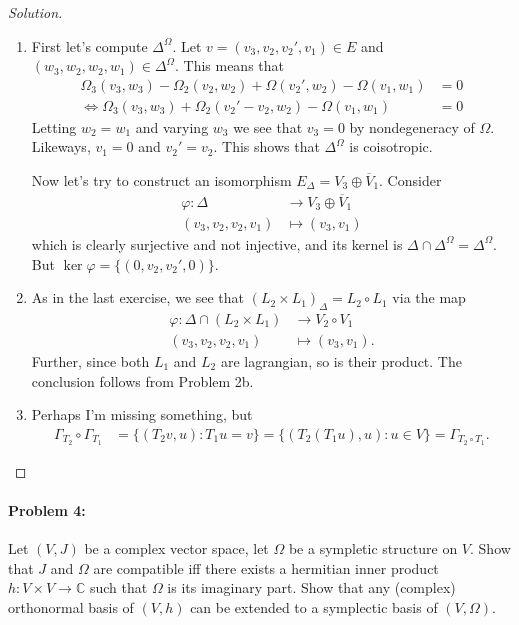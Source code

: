 \begin{proof}[Solution]\leavevmode
	\begin{enumerate}[label=\alph*.]
		\item First let's compute $\Delta^\Omega$. Let $v=(v_3,v_2,v_2',v_1)\in E$ and $(w_3,w_2,w_2,w_1)\in\Delta^\Omega$. This means that
		\begin{align*}\Omega_3(v_3,w_3)-\Omega_2(v_2,w_2)+\Omega(v_2',w_2)-\Omega(v_1,w_1)&=0\\
		\iff\Omega_3(v_3,w_3)+\Omega_2(v_2'-v_2,w_2)-\Omega(v_1,w_1)&=0
		\end{align*}
		Letting $w_2=w_1$ and varying $w_3$ we see that $v_3=0$ by nondegeneracy of $\Omega$. Likeways, $v_1=0$ and $v_2'=v_2$. This shows that $\Delta^\Omega$ is coisotropic.

Now let's try to construct an isomorphism $E_{\Delta}=V_3\oplus \overline{V}_{1}$. Consider
\begin{align*}
	\varphi: \Delta &\longrightarrow V_3\oplus \overline{V}_{1} \\
	(v_3,v_2,v_2,v_1) &\longmapsto (v_3,v_1)
\end{align*}
which is clearly surjective and not injective, and its kernel is $ \Delta \cap \Delta^{\Omega}=\Delta^\Omega$. But $\ker \varphi=\{(0,v_2,v_2',0)\}$.

	\item As in the last exercise, we see that $(L_2\times L_1)_\Delta= L_2\circ L_1$ via the map
\begin{align*}
	\varphi: \Delta\cap(L_2\times L_1) &\longrightarrow V_2\circ V_1 \\
	(v_3,v_2,v_2,v_1) &\longmapsto (v_3,v_1).
\end{align*}
Further, since both $L_1$ and $L_2$ are lagrangian, so is their product. The conclusion follows from Problem 2b.

	\item  Perhaps I'm missing something, but
		\begin{align*}
			\Gamma_{T_2}\circ \Gamma_{T_1}&=\{(T_2v,u):T_1u=v\} =\{(T_2(T_1u),u):u\in V\} =\Gamma_{T_2\circ T_1}.
		\end{align*}
\end{enumerate}
\end{proof}

\paragraph{Problem 4:} Let $(V,J)$ be a complex vector space, let $\Omega$ be a sympletic structure on $V$. Show that $J$ and $\Omega$ are compatible iff there exists a hermitian inner product $h:V\times V\to \mathbb{C}$ such that $\Omega$ is its imaginary part. Show that any (complex) orthonormal basis of  $(V,h)$ can be extended to a symplectic basis of $(V,\Omega)$.

